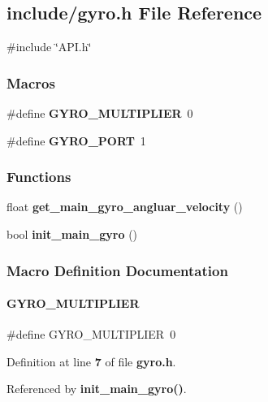 \subsection{include/gyro.h File Reference}
\label{gyro_8h}
{\ttfamily \#include \char`\"{}A\+P\+I.\+h\char`\"{}}\newline
\subsubsection*{Macros}
\begin{DoxyCompactItemize}
\item 
\#define \textbf{ G\+Y\+R\+O\+\_\+\+M\+U\+L\+T\+I\+P\+L\+I\+ER}~0
\item 
\#define \textbf{ G\+Y\+R\+O\+\_\+\+P\+O\+RT}~1
\end{DoxyCompactItemize}
\subsubsection*{Functions}
\begin{DoxyCompactItemize}
\item 
float \textbf{ get\+\_\+main\+\_\+gyro\+\_\+angluar\+\_\+velocity} ()
\item 
bool \textbf{ init\+\_\+main\+\_\+gyro} ()
\end{DoxyCompactItemize}


\subsubsection{Macro Definition Documentation}
\mbox{\label{gyro_8h_a482017cc25be9213fef3222112eb1c7f}} 
\paragraph{G\+Y\+R\+O\+\_\+\+M\+U\+L\+T\+I\+P\+L\+I\+ER}
{\footnotesize\ttfamily \#define G\+Y\+R\+O\+\_\+\+M\+U\+L\+T\+I\+P\+L\+I\+ER~0}



Definition at line \textbf{ 7} of file \textbf{ gyro.\+h}.



Referenced by \textbf{ init\+\_\+main\+\_\+gyro()}.

\mbox{\label{gyro_8h_a51d281e7676749d34aab3f8ba6fab960}} 
